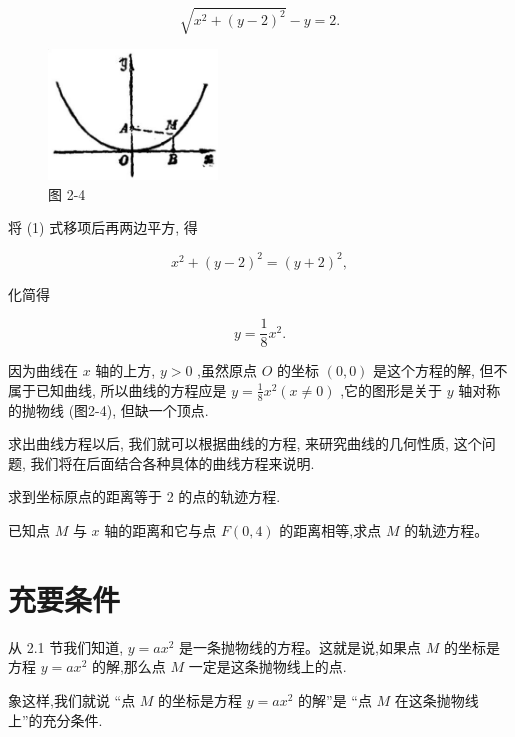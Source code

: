 \documentclass[lang=cn,newtx,10pt,scheme=chinese]{elegantbook}
\begin{document}
\[
  \sqrt{{x}^{2} + {\left( y - 2\right) }^{2}} - y = 2. \tag{1}
\]

\begin{figure}[h]
  \centering
  \includegraphics[max width=0.4\textwidth]{images/01912cc2-ffb6-728e-9ae7-b113ff05c64b_70_664169.jpg}
  \caption{图 2-4}
\end{figure}



将 (1) 式移项后再两边平方, 得

\[
    {x}^{2} + {\left( y - 2\right) }^{2} = {\left( y + 2\right) }^{2},
\]

化简得

\[
  y = \frac{1}{8}{x}^{2}.
\]

因为曲线在 \(x\) 轴的上方, \(y > 0\) ,虽然原点 \(O\) 的坐标 \(\left( {0,0}\right)\) 是这个方程的解, 但不属于已知曲线, 所以曲线的方程应是 \(y = \frac{1}{8}{x}^{2}\left( {x \neq 0}\right)\) ,它的图形是关于 \(y\) 轴对称的抛物线 (图2-4), 但缺一个顶点.

求出曲线方程以后, 我们就可以根据曲线的方程, 来研究曲线的几何性质, 这个问题, 我们将在后面结合各种具体的曲线方程来说明.

\begin{problemset}[练习]

\item 求到坐标原点的距离等于 2 的点的轨迹方程.

\item 已知点 \(M\) 与 \(x\) 轴的距离和它与点 \(F\left( {0,4}\right)\) 的距离相等,求点 \(M\) 的轨迹方程。

\end{problemset}

\section{充要条件}

从 2.1 节我们知道, \(y = a{x}^{2}\) 是一条抛物线的方程。这就是说,如果点 \(M\) 的坐标是方程 \(y = a{x}^{2}\) 的解,那么点 \(M\) 一定是这条抛物线上的点.

象这样,我们就说 “点 \(M\) 的坐标是方程 \(y = a{x}^{2}\) 的解”是 “点 \(M\) 在这条抛物线上”的充分条件.
\end{document}
